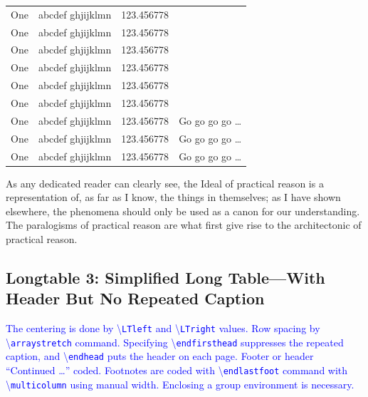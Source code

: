 \documentclass[phd]{ndsu-thesis-2022}
\newcommand\italk[1]{\textcolor{blue}{#1}}  %
\newcommand\cmd[1]{\textbackslash\texttt{#1}}  %
\begin{document}
\begin{longtable}{l l l l}
One & abcdef ghjijklmn & 123.456778 \\
One & abcdef ghjijklmn & 123.456778 \\
One & abcdef ghjijklmn & 123.456778 \\
One & abcdef ghjijklmn & 123.456778 \\
One & abcdef ghjijklmn & 123.456778 \\
One & abcdef ghjijklmn & 123.456778 \\
One & abcdef ghjijklmn & 123.456778  & Go go go go \ldots \\
One & abcdef ghjijklmn & 123.456778  & Go go go go \ldots \\
One & abcdef ghjijklmn & 123.456778  & Go go go go \ldots \\
\bottomrule
\end{longtable}
\endgroup

As any dedicated reader can clearly see, the Ideal of practical reason is a representation
of, as far as I know, the things in themselves; as I have shown elsewhere, the phenomena
should only be used as a canon for our understanding. The paralogisms of practical reason
are what first give rise to the architectonic of practical reason.


\subsection{Longtable 3: Simplified Long Table---With Header But No Repeated Caption }

\italk{The centering is done by \cmd{LTleft} and \cmd{LTright} values. Row spacing by \\\cmd{arraystretch} command. Specifying \cmd{endfirsthead} suppresses the repeated caption, and \cmd{endhead} puts the header on each page. Footer or header ``Continued \ldots'' coded. Footnotes are coded with \cmd{endlastfoot} command with \cmd{multicolumn} using manual width. Enclosing a group environment is necessary.}
\end{document}
